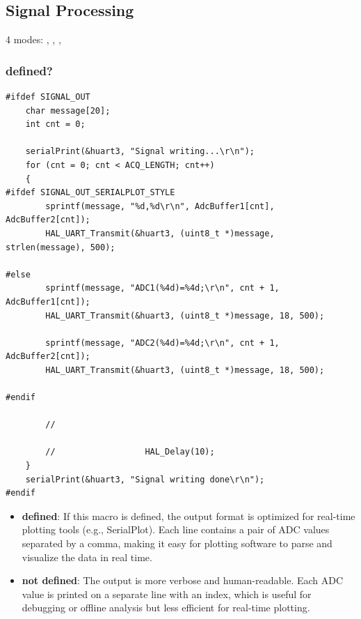 \subsection{Signal Processing}
4 modes: , , , 

\subsubsection{ defined?}
\begin{lstlisting}
#ifdef SIGNAL_OUT
    char message[20];
    int cnt = 0;

    serialPrint(&huart3, "Signal writing...\r\n");
    for (cnt = 0; cnt < ACQ_LENGTH; cnt++)
    {       
#ifdef SIGNAL_OUT_SERIALPLOT_STYLE
        sprintf(message, "%d,%d\r\n", AdcBuffer1[cnt], AdcBuffer2[cnt]);
        HAL_UART_Transmit(&huart3, (uint8_t *)message, strlen(message), 500);

#else
        sprintf(message, "ADC1(%4d)=%4d;\r\n", cnt + 1, AdcBuffer1[cnt]);
        HAL_UART_Transmit(&huart3, (uint8_t *)message, 18, 500);

        sprintf(message, "ADC2(%4d)=%4d;\r\n", cnt + 1, AdcBuffer2[cnt]);
        HAL_UART_Transmit(&huart3, (uint8_t *)message, 18, 500);

#endif

        //

        //	  	  		 	HAL_Delay(10);
    }
    serialPrint(&huart3, "Signal writing done\r\n");
#endif
\end{lstlisting}

\begin{itemize}
    \item \textbf{ defined}: If this macro is defined, the output format is optimized for real-time plotting tools (e.g., SerialPlot). Each line contains a pair of ADC values separated by a comma, making it easy for plotting software to parse and visualize the data in real time.
    \item \textbf{ not defined}: The output is more verbose and human-readable. Each ADC value is printed on a separate line with an index, which is useful for debugging or offline analysis but less efficient for real-time plotting.

\end{itemize}

